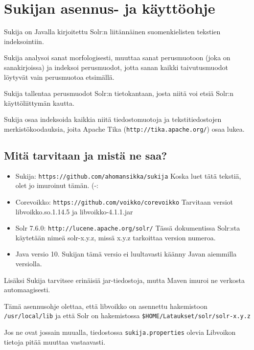 \documentclass[12pt]{article}
\begin{document}
\pagestyle{fancy}
\setlength{\parindent}{0pt}
\setlength{\parskip}{1ex plus 0.5ex minus 0.2ex}
\section*{Sukijan asennus- ja käyttöohje}


Sukija on Javalla kirjoitettu Solr:n liitännäinen suomenkielisten
tekstien indeksointiin.

Sukija analysoi sanat morfologisesti, muuttaa sanat perusmuotoon (joka
on sanakirjoissa) ja indeksoi perusmuodot, jotta sanan kaikki
taivutusmuodot löytyvät vain perusmuotoa etsimällä.

Sukija tallentaa perusmuodot Solr:n tietokantaan, josta niitä voi
etsiä Solr:n käyttöliittymän kautta.

Sukija osaa indeksoida kaikkia niitä tiedostomuotoja ja
tekstitiedostojen merkistökoodauksia, joita Apache Tika
(\verb=http://tika.apache.org/=) osaa lukea.


\subsection*{Mitä tarvitaan ja mistä ne saa?}

\begin{itemize}
\item Sukija:
      \verb=https://github.com/ahomansikka/sukija=
      Koska luet tätä tekstiä, olet jo imuroinut tämän. (-:

\item Corevoikko:
      \verb=https://github.com/voikko/corevoikko=
      Tarvitaan versiot libvoikko.so.1.14.5 ja libvoikko-4.1.1.jar

\item Solr 7.6.0:
      \verb=http://lucene.apache.org/solr/=
      Tässä dokumentissa Solr:sta käytetään nimeä solr-x.y.z,
      missä x.y.z tarkoittaa version numeroa.

\item Java versio 10. Sukijan tämä versio ei luultavasti käänny Javan
      aiemmilla versiolla.
\end{itemize}


Lisäksi Sukija tarvitsee erinäisiä jar-tiedostoja, mutta Maven imuroi
ne verkosta automaagisesti.

Tämä asennusohje olettaa, että libvoikko on asennettu hakemistoon
\verb=/usr/local/lib= ja että Solr on hakemistossa
\verb=$HOME/Lataukset/solr/solr-x.y.z=

Jos ne ovat jossain muualla, tiedostossa \verb=sukija.properties=
olevia Libvoikon tietoja pitää muuttaa vastaavasti.
\end{document}
